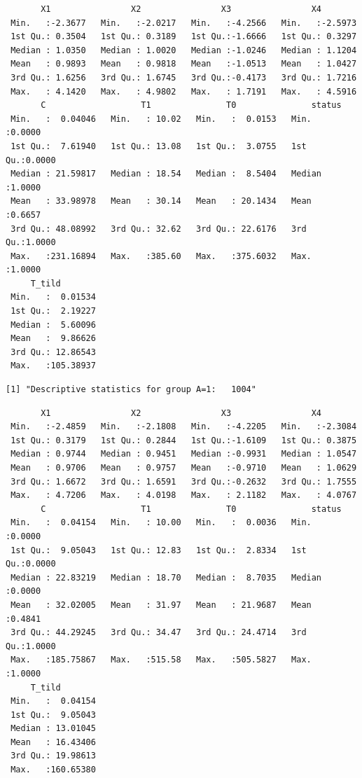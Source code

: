 \documentclass[
  11pt,
  a4paper,
]{article}
\theoremstyle{plain}
\theoremstyle{plain}
\theoremstyle{plain}
\theoremstyle{definition}
\theoremstyle{remark}
\begin{document}
\begin{verbatim}
       X1                X2                X3                X4         
 Min.   :-2.3677   Min.   :-2.0217   Min.   :-4.2566   Min.   :-2.5973  
 1st Qu.: 0.3504   1st Qu.: 0.3189   1st Qu.:-1.6666   1st Qu.: 0.3297  
 Median : 1.0350   Median : 1.0020   Median :-1.0246   Median : 1.1204  
 Mean   : 0.9893   Mean   : 0.9818   Mean   :-1.0513   Mean   : 1.0427  
 3rd Qu.: 1.6256   3rd Qu.: 1.6745   3rd Qu.:-0.4173   3rd Qu.: 1.7216  
 Max.   : 4.1420   Max.   : 4.9802   Max.   : 1.7191   Max.   : 4.5916  
       C                   T1               T0               status      
 Min.   :  0.04046   Min.   : 10.02   Min.   :  0.0153   Min.   :0.0000  
 1st Qu.:  7.61940   1st Qu.: 13.08   1st Qu.:  3.0755   1st Qu.:0.0000  
 Median : 21.59817   Median : 18.54   Median :  8.5404   Median :1.0000  
 Mean   : 33.98978   Mean   : 30.14   Mean   : 20.1434   Mean   :0.6657  
 3rd Qu.: 48.08992   3rd Qu.: 32.62   3rd Qu.: 22.6176   3rd Qu.:1.0000  
 Max.   :231.16894   Max.   :385.60   Max.   :375.6032   Max.   :1.0000  
     T_tild         
 Min.   :  0.01534  
 1st Qu.:  2.19227  
 Median :  5.60096  
 Mean   :  9.86626  
 3rd Qu.: 12.86543  
 Max.   :105.38937  
\end{verbatim}

\begin{verbatim}
[1] "Descriptive statistics for group A=1:   1004"
\end{verbatim}

\begin{verbatim}
       X1                X2                X3                X4         
 Min.   :-2.4859   Min.   :-2.1808   Min.   :-4.2205   Min.   :-2.3084  
 1st Qu.: 0.3179   1st Qu.: 0.2844   1st Qu.:-1.6109   1st Qu.: 0.3875  
 Median : 0.9744   Median : 0.9451   Median :-0.9931   Median : 1.0547  
 Mean   : 0.9706   Mean   : 0.9757   Mean   :-0.9710   Mean   : 1.0629  
 3rd Qu.: 1.6672   3rd Qu.: 1.6591   3rd Qu.:-0.2632   3rd Qu.: 1.7555  
 Max.   : 4.7206   Max.   : 4.0198   Max.   : 2.1182   Max.   : 4.0767  
       C                   T1               T0               status      
 Min.   :  0.04154   Min.   : 10.00   Min.   :  0.0036   Min.   :0.0000  
 1st Qu.:  9.05043   1st Qu.: 12.83   1st Qu.:  2.8334   1st Qu.:0.0000  
 Median : 22.83219   Median : 18.70   Median :  8.7035   Median :0.0000  
 Mean   : 32.02005   Mean   : 31.97   Mean   : 21.9687   Mean   :0.4841  
 3rd Qu.: 44.29245   3rd Qu.: 34.47   3rd Qu.: 24.4714   3rd Qu.:1.0000  
 Max.   :185.75867   Max.   :515.58   Max.   :505.5827   Max.   :1.0000  
     T_tild         
 Min.   :  0.04154  
 1st Qu.:  9.05043  
 Median : 13.01045  
 Mean   : 16.43406  
 3rd Qu.: 19.98613  
 Max.   :160.65380  
\end{verbatim}
\end{document}
